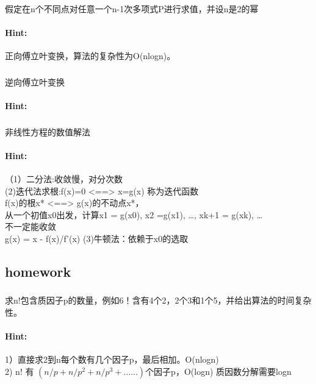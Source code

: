 \documentclass{article}
\begin{document}
     
     \subsubsection{}假定在n个不同点对任意一个n-1次多项式P进行求值，并设n是2的幂
     \paragraph{Hint:}正向傅立叶变换，算法的复杂性为O(nlogn)。
     
     
     \subsubsection{}逆向傅立叶变换
     \paragraph{Hint:}
     
     
     \subsubsection{}非线性方程的数值解法
     \paragraph{Hint:}（1）二分法:收敛慢，对分次数\\
     (2)迭代法求根:f(x)=0 <==> x=g(x) 称为迭代函数\\
f(x)的根x* <==> g(x)的不动点x*，\\
从一个初值x0出发，计算x1 = g(x0), x2 =g(x1), …, xk+1 = g(xk), … \\
不一定能收敛\\
g(x) = x - f(x)/f'(x)
     (3)牛顿法：依赖于x0的选取\\
      \subsection{homework}
     
     \subsubsection{}求n!包含质因子p的数量，例如6！含有4个2，2个3和1个5，并给出算法的时间复杂性。
     \paragraph{Hint:}1）直接求2到n每个数有几个因子p，最后相加。O(nlogn)\\
     2) n! 有 $(n/p+n/p^{2}+n/p^{3}+……)$个因子p，O(logn) 质因数分解需要logn\\
     
\end{document}
